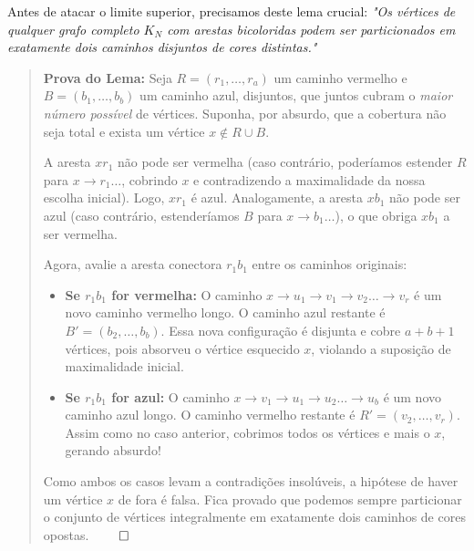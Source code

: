 \documentclass[11pt, a4paper]{article}
\begin{document}
Antes de atacar o limite superior, precisamos deste lema crucial: \textit{"Os vértices de qualquer grafo completo $K_N$ com arestas bicoloridas podem ser particionados em exatamente dois caminhos disjuntos de cores distintas."}
\begin{quote}
\small
\textbf{Prova do Lema:} Seja $R = (r_1, \dots, r_a)$ um caminho vermelho e $B = (b_1, \dots, b_b)$ um caminho azul, disjuntos, que juntos cubram o \textit{maior número possível} de vértices. Suponha, por absurdo, que a cobertura não seja total e exista um vértice $x \notin R \cup B$.

A aresta $x r_1$ não pode ser vermelha (caso contrário, poderíamos estender $R$ para $x \to r_1 \dots$, cobrindo $x$ e contradizendo a maximalidade da nossa escolha inicial). Logo, $x r_1$ é azul. Analogamente, a aresta $x b_1$ não pode ser azul (caso contrário, estenderíamos $B$ para $x \to b_1 \dots$), o que obriga $x b_1$ a ser vermelha.

Agora, avalie a aresta conectora $r_1 b_1$ entre os caminhos originais:
\begin{itemize}
    \item \textbf{Se $r_1 b_1$ for vermelha:} O caminho $x \to u_1 \to v_1 \to v_2 \dots \to v_r$ é um novo caminho vermelho longo. O caminho azul restante é $B' = (b_2, \dots, b_b)$. Essa nova configuração é disjunta e cobre $a+b+1$ vértices, pois absorveu o vértice esquecido $x$, violando a suposição de maximalidade inicial.
    \item \textbf{Se $r_1 b_1$ for azul:} O caminho $x \to v_1 \to u_1 \to u_2 \dots \to u_b$ é um novo caminho azul longo. O caminho vermelho restante é $R' = (v_2, \dots, v_r)$. Assim como no caso anterior, cobrimos todos os vértices e mais o $x$, gerando absurdo!
\end{itemize}
Como ambos os casos levam a contradições insolúveis, a hipótese de haver um vértice $x$ de fora é falsa. Fica provado que podemos sempre particionar o conjunto de vértices integralmente em exatamente dois caminhos de cores opostas. $\qed$
\end{quote}
\end{document}
